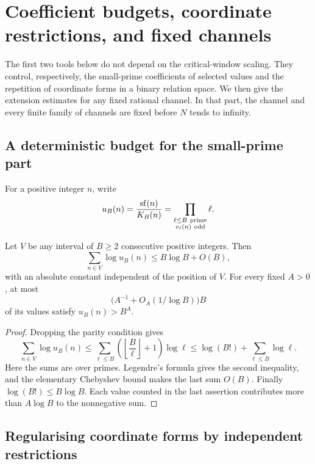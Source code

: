 \section{Coefficient budgets, coordinate restrictions, and fixed channels}
\label{p1:arith:supplement}

The first two tools below do not depend on the critical-window scaling.
They control, respectively, the small-prime coefficients of selected
values and the repetition of coordinate forms in a binary relation space.
We then give the extension estimates for any fixed rational channel.
In that part, the channel and every finite family of channels are fixed
before \(N\) tends to infinity.

\subsection{A deterministic budget for the small-prime part}

For a positive integer \(n\), write
\[
 u_B(n)=\frac{\sf(n)}{K_B(n)}
       =\prod_{\substack{\ell\leq B\ {\rm prime}\\v_\ell(n)\ {\rm odd}}}\ell.
\]

\begin{lemma}
\label{p1:arith:smallpart-budget}
Let \(V\) be any interval of \(B\geq2\) consecutive positive integers.
Then
\[
 \sum_{n\in V}\log u_B(n)\leq B\log B+O(B),
\]
with an absolute constant independent of the position of \(V\).
For every fixed \(A>0\), at most
\[
 \bigl(A^{-1}+O_A(1/\log B)\bigr)B
\]
of its values satisfy \(u_B(n)>B^A\).
\end{lemma}

\begin{proof}
Dropping the parity condition gives
\[
 \sum_{n\in V}\log u_B(n)
 \leq\sum_{\ell\leq B}
       \left(\left\lfloor\frac B\ell\right\rfloor+1\right)\log\ell
 \leq\log(B!)+\sum_{\ell\leq B}\log\ell.
\]
Here the sums are over primes.  Legendre's formula gives the second
inequality, and the elementary Chebyshev bound makes the last sum
\(O(B)\).  Finally \(\log(B!)\leq B\log B\).
Each value counted in the last assertion contributes more than
\(A\log B\) to the nonnegative sum.
\end{proof}

\subsection{Regularising coordinate forms by independent restrictions}


